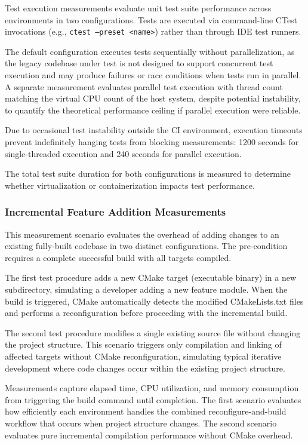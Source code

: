 Test execution measurements evaluate unit test suite performance across environments in two configurations.
Tests are executed via command-line CTest invocations (e.g., \texttt{ctest --preset <name>}) rather than through IDE test runners.

The default configuration executes tests sequentially without parallelization, as the legacy codebase under test is not designed to support concurrent test execution and may produce failures or race conditions when tests run in parallel.
A separate measurement evaluates parallel test execution with thread count matching the virtual CPU count of the host system, despite potential instability, to quantify the theoretical performance ceiling if parallel execution were reliable.

Due to occasional test instability outside the CI environment, execution timeouts prevent indefinitely hanging tests from blocking measurements: 1200 seconds for single-threaded execution and 240 seconds for parallel execution.

The total test suite duration for both configurations is measured to determine whether virtualization or containerization impacts test performance.

\subsubsection{Incremental Feature Addition Measurements}

This measurement scenario evaluates the overhead of adding changes to an existing fully-built codebase in two distinct configurations.
The pre-condition requires a complete successful build with all targets compiled.

The first test procedure adds a new CMake target (executable binary) in a new subdirectory, simulating a developer adding a new feature module.
When the build is triggered, CMake automatically detects the modified CMakeLists.txt files and performs a reconfiguration before proceeding with the incremental build.

The second test procedure modifies a single existing source file without changing the project structure.
This scenario triggers only compilation and linking of affected targets without CMake reconfiguration, simulating typical iterative development where code changes occur within the existing project structure.

Measurements capture elapsed time, CPU utilization, and memory consumption from triggering the build command until completion.
The first scenario evaluates how efficiently each environment handles the combined reconfigure-and-build workflow that occurs when project structure changes.
The second scenario evaluates pure incremental compilation performance without CMake overhead.

